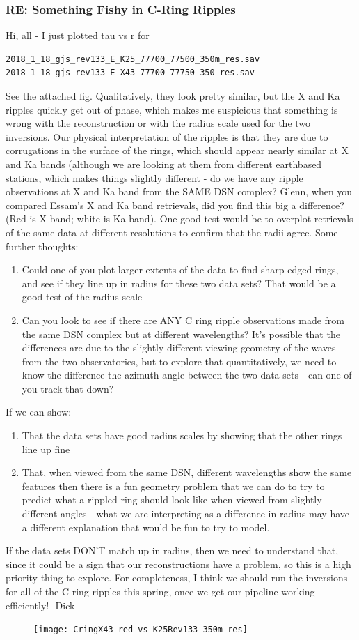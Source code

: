 \documentclass[crop=false,class=article,oneside]{standalone}
\begin{document}
\subsubsection{\footnotesize RE: Something Fishy in C-Ring Ripples}
Hi, all - I just plotted tau vs r for 
\begin{lstlisting}[language=bash]
2018_1_18_gjs_rev133_E_K25_77700_77500_350m_res.sav 
2018_1_18_gjs_rev133_E_X43_77700_77750_350_res.sav
\end{lstlisting}
See the attached fig. Qualitatively, they look pretty similar, but the X and Ka ripples quickly get out of phase, which makes me suspicious that something is wrong with the reconstruction or with the radius scale used for the two inversions. Our physical interpretation of the ripples is that they are due to corrugations in the surface of the rings, which should appear nearly similar at X and Ka bands (although we are looking at them from different earthbased stations, which makes things slightly different - do we have any ripple observations at X and Ka band from the SAME DSN complex? Glenn, when you compared Essam's X and Ka band retrievals, did you find this big a difference? (Red is X band; white is Ka band). One good test would be to overplot retrievals of the same data at different resolutions to confirm that the radii agree. Some further thoughts:
\begin{enumerate}
    \item Could one of you plot larger extents of the data to find sharp-edged rings, and see if they line up in radius for these two data sets? That would be a good test of the radius scale
    \item Can you look to see if there are ANY C ring ripple observations made from the same DSN complex but at different wavelengths? It's possible that the differences are due to the slightly different viewing geometry of the waves from the two observatories, but to explore that quantitatively, we need to know the difference the azimuth angle between the two data sets - can one of you track that down?
\end{enumerate}
If we can show:
\begin{enumerate}
    \item That the data sets have good radius scales by showing that the other rings line up fine
    \item That, when viewed from the same DSN, different wavelengths show the same features then there is a fun geometry problem that we can do to try to predict what a rippled ring should look like when viewed from slightly different angles - what we are interpreting as a difference in radius may have a different explanation that would be fun to try to model.
\end{enumerate}
If the data sets DON'T match up in radius, then we need to understand that, since it could be a sign that our reconstructions have a problem, so this is a high priority thing to explore. For completeness, I think we should run the inversions for all of the C ring ripples this spring, once we get our pipeline working efficiently! -Dick
\begin{figure}[H]
    \centering
    \texttt{[image: CringX43-red-vs-K25Rev133\_350m\_res]}
\end{figure}
\end{document}
